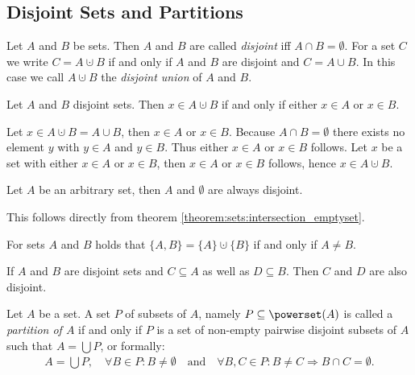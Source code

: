 \subsection{Disjoint Sets and Partitions}

\begin{definition}
    Let $A$ and $B$ be sets. Then $A$ and $B$ are called \emph{disjoint} iff $A\cap B=\emptyset$. For a set $C$ we write $C=A\cupdot B$ if and only if $A$ and $B$ are disjoint and $C=A\cup B$. In this case we call $A\cupdot B$ the \emph{disjoint union} of $A$ and $B$.
\end{definition}

\begin{remarks}
    \begin{remarkenumerate}
        \item Let $A$ and $B$ disjoint sets. Then $x\in A\cupdot B$ if and only if either $x\in A$ or $x\in B$.
        \begin{miniproof}
            \proofright Let $x\in A\cupdot B=A\cup B$, then $x\in A$ or $x\in B$. Because $A\cap B=\emptyset$ there exists no element $y$ with $y\in A$ and $y\in B$. Thus either $x\in A$ or $x\in B$ follows.
            \proofleft Let $x$ be a set with either $x\in A$ or $x\in B$, then $x\in A$ or $x\in B$ follows, hence $x\in A\cupdot B$.
        \end{miniproof}
        \item Let $A$ be an arbitrary set, then $A$ and $\emptyset$ are always disjoint.
        \begin{miniproof}
            This follows directly from theorem \ref{theorem:sets:intersection_emptyset}.
        \end{miniproof}
    \end{remarkenumerate}
\end{remarks}

\begin{examples}
    \begin{exampleenumerate}
        \item\label{example:sets:singleton_disjoint} For sets $A$ and $B$ holds that $\{A,B\}=\{A\}\cupdot\{B\}$ if and only if $A\neq B$.
        \item If $A$ and $B$ are disjoint sets and $C\subseteq A$ as well as $D\subseteq B$. Then $C$ and $D$ are also disjoint.
    \end{exampleenumerate}
\end{examples}

\begin{definition}
    Let $A$ be a set. A set $P$ of subsets of $A$, namely $P\subseteq \powerset(A)$ is called a \emph{partition of $A$} if and only if $P$ is a set of non-empty pairwise disjoint subsets of $A$ such that $A=\bigcup P$, or formally:
    \begin{align}A=\bigcup P,\quad\forall B\in P\colon B\neq\emptyset\quad\text{and}\quad \forall B,C\in P\colon B\neq C\Rightarrow B\cap C=\emptyset.\end{align}
\end{definition}


